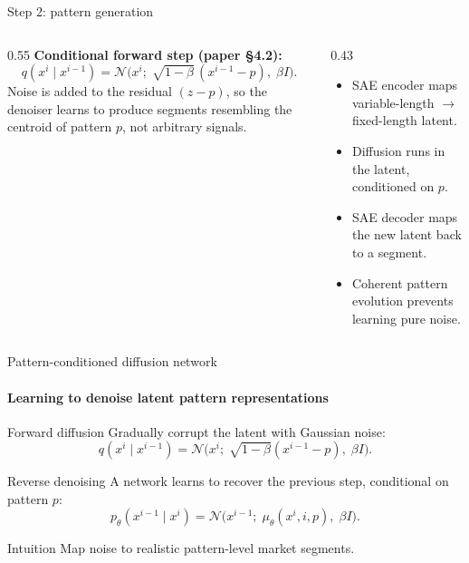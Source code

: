 \begin{frame}{Step 2: pattern generation}
\vspace{1mm}
\begin{columns}[T,onlytextwidth]
\begin{column}{0.55\textwidth}\scriptsize
\textbf{Conditional forward step (paper \S4.2):}
\[ q(x^{i}\mid x^{i-1}) = \mathcal{N}\!\bigl(x^{i};\;\sqrt{1-\beta}\,(x^{i-1}-p),\;\beta I\bigr). \]
Noise is added to the residual $(z-p)$, so the denoiser learns to produce segments resembling the centroid of pattern $p$, not arbitrary signals.
\end{column}
\begin{column}{0.43\textwidth}\scriptsize
\begin{itemize}\setlength\itemsep{1pt}\setlength\topsep{0pt}
  \item SAE encoder maps variable-length $\to$ fixed-length latent.
  \item Diffusion runs in the latent, conditioned on $p$.
  \item SAE decoder maps the new latent back to a segment.
  \item \alert{Coherent pattern evolution} prevents learning pure noise.
\end{itemize}
\end{column}
\end{columns}
\end{frame}

\begin{frame}{Pattern-conditioned diffusion network}
\framesubtitle{Learning to denoise latent pattern representations}
\begin{block}{Forward diffusion}
Gradually corrupt the latent with Gaussian noise:
\[ q(x^i \mid x^{i-1}) = \mathcal{N}\!\bigl(x^i;\;\sqrt{1-\beta}(x^{i-1}-p),\;\beta I\bigr). \]
\end{block}
\begin{alertblock}{Reverse denoising}
A network learns to recover the previous step, conditional on pattern $p$:
\[ p_{\theta}(x^{i-1} \mid x^i) = \mathcal{N}\!\bigl(x^{i-1};\;\mu_{\theta}(x^i,i,p),\;\beta I\bigr). \]
\end{alertblock}
\begin{block}{Intuition}
Map noise to realistic pattern-level market segments.
\end{block}
\end{frame}

